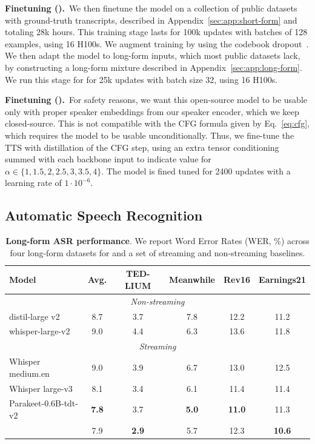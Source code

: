 \documentclass{article}
\begin{document}
\textbf{Finetuning (\oursASR{}).}\ We then finetune the model on a collection of public datasets with ground-truth transcripts, described in Appendix~\ref{sec:app:short-form} and totaling 28k hours. This training stage lasts for 100k updates with batches of 128 examples, using 16 H100s.  We augment training by using the codebook dropout~\citep{moshi}.
We then adapt the model to long-form inputs, which most public datasets lack, by constructing a long-form mixture described in Appendix~\ref{sec:app:long-form}. We run this stage for \oursASR{} for 25k updates with batch size 32, using 16 H100s. %

\textbf{Finetuning (\oursTTS{}).}\ 
 For safety reasons, we want this open-source model to be usable only with proper speaker embeddings from our speaker encoder, which we keep closed-source. This is not compatible with the CFG formula given by Eq.~\eqref{eq:cfg}, which requires the model to be usable unconditionally.
 Thus, we fine-tune the TTS with distillation of the CFG step, using an extra tensor conditioning summed with each backbone input to indicate value for $\alpha \in \{1, 1.5, 2, 2.5, 3, 3.5, 4\}$.
 The model is fined tuned for 2400 updates with a learning rate of $1\cdot 10 ^{-6}$.

\subsection{Automatic Speech Recognition}



\begin{table}[t]
\centering
\tiny
\caption{\textbf{Long-form ASR performance}. We report Word Error Rates (WER, \%) across four long-form datasets for \oursASR{} and a set of streaming and non-streaming baselines.}
\label{tab:longform-asr}
\begin{sc}
\begin{tabular}{lc|cccc}
\toprule
\textbf{Model} & \textbf{Avg.} & \textbf{TED-LIUM} & \textbf{Meanwhile} & \textbf{Rev16} & \textbf{Earnings21} \\%
\midrule
\multicolumn{6}{c}{\textit{Non-streaming}} \\
\midrule[0.3pt]
distil-large v2 & 8.7 & 3.7 & 7.8 & 12.2 & 11.2 \\ %
whisper-large-v2 & 9.0 & 4.4 & 6.3 & 13.6 & 11.8 \\ %
\midrule
\multicolumn{6}{c}{\textit{Streaming}} \\
\midrule[0.3pt]
Whisper medium.en & 9.0 & 3.9 & 6.7 & 13.0 & 12.5 \\ %
Whisper large-v3 & 8.1 & 3.4 & 6.1 & {11.4} & 11.4 \\ %
Parakeet-0.6B-tdt-v2 & \textbf{7.8} & 3.7 & \textbf{5.0} &\textbf{11.0} & 11.3  \\
\midrule
\oursASR & {7.9} & \textbf{2.9} & {5.7} & 12.3 & \textbf{10.6} \\ %
\bottomrule
\end{tabular}
\end{sc}
\end{table}
\end{document}
